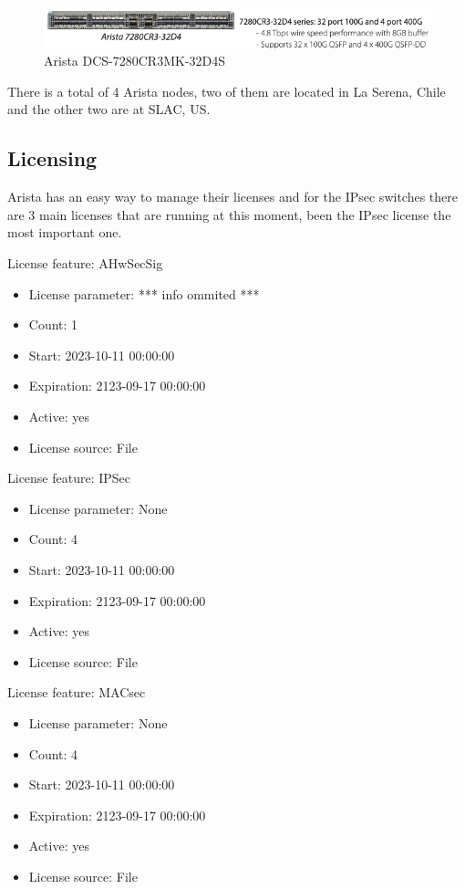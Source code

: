 \begin{figure}
    \includegraphics[width=16cm]{images/arista_datasheet01.png}
    \centering
    \caption{Arista DCS-7280CR3MK-32D4S}
  \end{figure}

There is a total of 4 Arista nodes, two of them are located in La Serena, Chile and the other two are at SLAC, US. 

\subsection{Licensing}

Arista has an easy way to manage their licenses and for the IPsec switches there are 3 main licenses that are running at this moment, been the IPsec license the most important one.

License feature: AHwSecSig
\begin{itemize}
\item License parameter:  *** info ommited *** 
\item Count: 1
\item Start: 2023-10-11 00:00:00
\item Expiration: 2123-09-17 00:00:00
\item Active: yes
\item License source: File
\end{itemize}

License feature: IPSec
\begin{itemize}
\item License parameter: None
\item Count: 4
\item Start: 2023-10-11 00:00:00
\item Expiration: 2123-09-17 00:00:00
\item Active: yes
\item License source: File
\end{itemize}

License feature: MACsec
\begin{itemize}
\item License parameter:  None
\item Count: 4
\item Start: 2023-10-11 00:00:00
\item Expiration: 2123-09-17 00:00:00
\item Active: yes
\item License source: File
\end{itemize}

